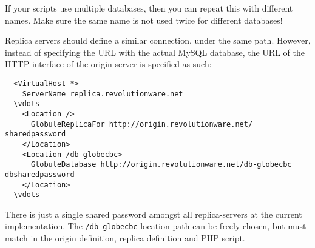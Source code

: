 \documentclass[10pt,a4paper]{article}
\makeatletter
\newenvironment{p}{\@open{P}{}}{\@close{P}}
\newenvironment{p}{}{\par}
\newcommand\subsectionbr{}
\newcommand{\ahrefselfloc}[1]{\ahrefloc{#1}{#1}}
\makeatother
\begin{document}
\begin{p}
If your scripts use multiple databases, then you can repeat this with
different names. Make sure the same name is not used twice for different
databases!
\end{p}


\begin{p}
Replica servers should define a similar connection, under the same path.
However, instead of specifying the URL with the actual MySQL database,
the URL of the HTTP interface of the origin server is specified as such:
\end{p}

\begin{Verbatim}
  <VirtualHost *>
    ServerName replica.revolutionware.net
  \vdots
    <Location />
      GlobuleReplicaFor http://origin.revolutionware.net/ sharedpassword
    </Location>
    <Location /db-globecbc>
      GlobuleDatabase http://origin.revolutionware.net/db-globecbc dbsharedpassword
    </Location>
  \vdots
\end{Verbatim}

\begin{p}
There is just a single shared password amongst all replica-servers at the
current implementation.  The \texttt{/db-globecbc} location path can be freely
chosen, but must match in the origin definition, replica definition and PHP
script.
\end{p}



%
%
%
%
\end{document}
